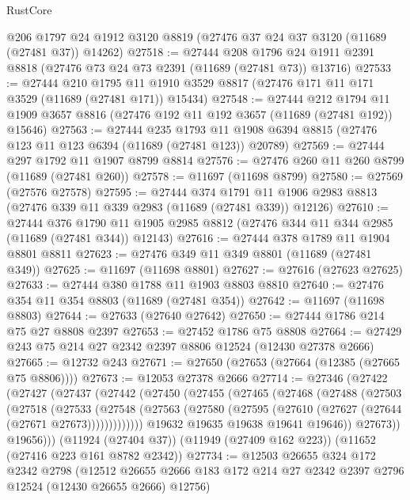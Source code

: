 \begin{lexlean}{RustCore}
\begin{coremodule}
    @206
    @1797
    @24
    @1912
    @3120
    @8819
    (@27476 @37 @24 @37 @3120 (@11689 (@27481 @37)) @14262)
@27518 := @27444
    @208
    @1796
    @24
    @1911
    @2391
    @8818
    (@27476 @73 @24 @73 @2391 (@11689 (@27481 @73)) @13716)
@27533 := @27444
    @210
    @1795
    @11
    @1910
    @3529
    @8817
    (@27476 @171 @11 @171 @3529 (@11689 (@27481 @171)) @15434)
@27548 := @27444
    @212
    @1794
    @11
    @1909
    @3657
    @8816
    (@27476 @192 @11 @192 @3657 (@11689 (@27481 @192)) @15646)
@27563 := @27444
    @235
    @1793
    @11
    @1908
    @6394
    @8815
    (@27476 @123 @11 @123 @6394 (@11689 (@27481 @123)) @20789)
@27569 := @27444 @297 @1792 @11 @1907 @8799 @8814
@27576 := @27476 @260 @11 @260 @8799 (@11689 (@27481 @260))
@27578 := @11697 (@11698 @8799)
@27580 := @27569 (@27576 @27578)
@27595 := @27444
    @374
    @1791
    @11
    @1906
    @2983
    @8813
    (@27476 @339 @11 @339 @2983 (@11689 (@27481 @339)) @12126)
@27610 := @27444
    @376
    @1790
    @11
    @1905
    @2985
    @8812
    (@27476 @344 @11 @344 @2985 (@11689 (@27481 @344)) @12143)
@27616 := @27444 @378 @1789 @11 @1904 @8801 @8811
@27623 := @27476 @349 @11 @349 @8801 (@11689 (@27481 @349))
@27625 := @11697 (@11698 @8801)
@27627 := @27616 (@27623 @27625)
@27633 := @27444 @380 @1788 @11 @1903 @8803 @8810
@27640 := @27476 @354 @11 @354 @8803 (@11689 (@27481 @354))
@27642 := @11697 (@11698 @8803)
@27644 := @27633 (@27640 @27642)
@27650 := @27444 @1786 @214 @75 @27 @8808 @2397
@27653 := @27452 @1786 @75 @8808
@27664 := @27429 @243 @75 @214 @27 @2342 @2397 @8806 @12524 (@12430 @27378 @2666)
@27665 := @12732 @243
@27671 := @27650 (@27653 (@27664 (@12385 (@27665 @75 @8806))))
@27673 := @12053 @27378 @2666
@27714 := @27346
    (@27422
      (@27427
        (@27437
          (@27442
            (@27450
              (@27455
                (@27465
                  (@27468
                    (@27488
                      (@27503
                        (@27518
                          (@27533
                            (@27548
                              (@27563
                                (@27580 (@27595 (@27610 (@27627 (@27644 (@27671 @27673)))))))))))))
                  @19632
                  @19635
                  @19638
                  @19641
                  @19646))
              @27673))
          @19656)))
    (@11924 (@27404 @37))
    (@11949 (@27409 @162 @223))
    (@11652 (@27416 @223 @161 @8782 @2342))
@27734 := @12503
    @26655
    @324
    @172
    @2342
    @2798
    (@12512 @26655 @2666 @183 @172 @214 @27 @2342 @2397 @2796 @12524 (@12430 @26655 @2666) @12756)

\end{coremodule}
\end{lexlean}
